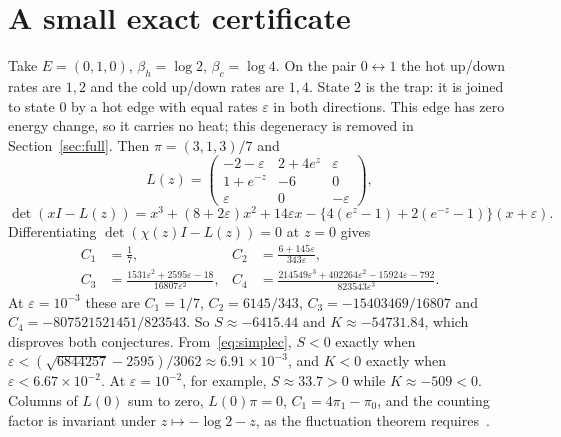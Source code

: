 \documentclass[11pt,a4paper]{article}
\theoremstyle{remark}\newtheorem{remark}[theorem]{Remark}
\newcommand{\eps}{\varepsilon}
\begin{document}
\section{A small exact certificate}\label{sec:simple}
Take $E=(0,1,0)$, $\beta_h=\log2$, $\beta_c=\log4$. On the pair $0\leftrightarrow1$ the hot up/down rates are $1,2$ and the cold up/down rates are $1,4$. State $2$ is the trap: it is joined to state $0$ by a hot edge with equal rates $\eps$ in both directions. This edge has zero energy change, so it carries no heat; this degeneracy is removed in Section~\ref{sec:full}. Then $\pi=(3,1,3)/7$ and
\begin{equation}
L(z)=\begin{pmatrix}-2-\eps&2+4e^z&\eps\\1+e^{-z}&-6&0\\\eps&0&-\eps\end{pmatrix},
\end{equation}
\begin{equation}
\det(xI-L(z))=x^3+(8+2\eps)x^2+14\eps x-\{4(e^z-1)+2(e^{-z}-1)\}(x+\eps).
\end{equation}
Differentiating $\det(\chi(z)I-L(z))=0$ at $z=0$ gives
\begin{align}
C_1&=\frac17,& C_2&=\frac{6+145\eps}{343\eps},\nonumber\\
C_3&=\frac{1531\eps^2+2595\eps-18}{16807\eps^2},&
C_4&=\frac{214549\eps^3+402264\eps^2-15924\eps-792}{823543\eps^3}.\label{eq:simplec}
\end{align}
At $\eps=10^{-3}$ these are $C_1=1/7$, $C_2=6145/343$, $C_3=-15403469/16807$ and $C_4=-807521521451/823543$. So $S\approx-6415.44$ and $K\approx-54731.84$, which disproves both conjectures. From~\eqref{eq:simplec}, $S<0$ exactly when $\eps<(\sqrt{6844257}-2595)/3062\approx6.91\times10^{-3}$, and $K<0$ exactly when $\eps<6.67\times10^{-2}$. At $\eps=10^{-2}$, for example, $S\approx33.7>0$ while $K\approx-509<0$. Columns of $L(0)$ sum to zero, $L(0)\pi=0$, $C_1=4\pi_1-\pi_0$, and the counting factor is invariant under $z\mapsto-\log2-z$, as the fluctuation theorem requires~\cite{Esposito2009}.
\end{document}

